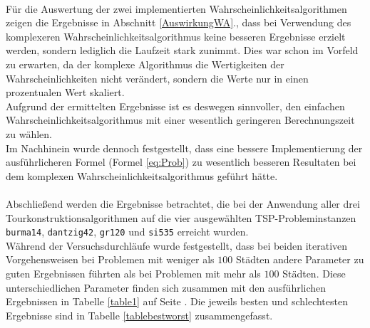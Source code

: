 \documentclass[doktyp=barbeit, sprache=german]{TUBAFarbeiten}
\begin{document}
\\Für die Auswertung der zwei implementierten Wahrscheinlichkeitsalgorithmen zeigen die Ergebnisse in Abschnitt \ref{AuswirkungWA}., dass bei Verwendung des komplexeren Wahrscheinlichkeitsalgorithmus keine besseren Ergebnisse erzielt werden, sondern lediglich die Laufzeit stark zunimmt. Dies war schon im Vorfeld zu erwarten, da der komplexe Algorithmus die Wertigkeiten der Wahrscheinlichkeiten nicht verändert, sondern die Werte nur in einen prozentualen Wert skaliert.
\\Aufgrund der ermittelten Ergebnisse ist es deswegen sinnvoller, den einfachen Wahrscheinlichkeitsalgorithmus mit einer wesentlich geringeren Berechnungszeit zu wählen.
\\Im Nachhinein wurde dennoch festgestellt, dass eine bessere Implementierung der ausführlicheren Formel (Formel \ref{eq:Prob}) zu wesentlich besseren Resultaten bei dem komplexen Wahrscheinlichkeitsalgorithmus geführt hätte.
\\\\Abschließend werden die Ergebnisse betrachtet, die bei der Anwendung aller drei Tourkonstruktionsalgorithmen auf die vier ausgewählten TSP-Probleminstanzen \texttt{burma14}, \texttt{dantzig42}, \texttt{gr120} und \texttt{si535} erreicht wurden. 
\\Während der Versuchsdurchläufe wurde festgestellt, dass bei beiden iterativen Vorgehensweisen bei Problemen mit weniger als $100$ Städten andere Parameter zu guten Ergebnissen führten als bei Problemen mit mehr als $100$ Städten. Diese unterschiedlichen Parameter finden sich zusammen mit den ausführlichen Ergebnissen in Tabelle \ref{table1} auf Seite \pageref{table1}. Die jeweils besten und schlechtesten Ergebnisse sind in Tabelle \ref{tablebestworst} zusammengefasst.
\end{document}
